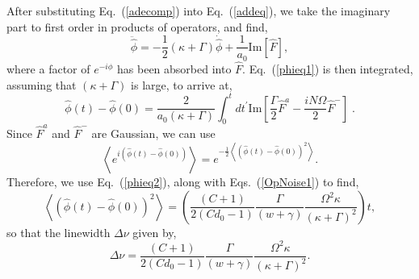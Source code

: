 \documentclass[aps,
twocolumn,
showpacs,
superscriptaddress,groupedaddress]{revtex4}
\begin{document}
After substituting Eq.~(\ref{adecomp}) into Eq.~(\ref{addeq}), we take
the imaginary part to first order in products of operators, and find,
\begin{equation}
\ddot{\hat{\phi}} =
-\frac{1}{2}(\kappa+\Gamma) \dot{\hat{\phi}} +
\frac{1}{a_0} \text{Im} [\hat{F}],
\label{phieq1}
\end{equation}
where a factor of $e^{-i\phi}$ has been absorbed into $\hat{F}$.
Eq.~(\ref{phieq1}) is then integrated, assuming that $(\kappa+\Gamma)$
is large, to arrive at,
\begin{equation}
\hat{\phi}(t) - \hat{\phi}(0) =
\frac{2}{a_0 (\kappa+\Gamma)}
\int_0^t dt^{\prime} \text{Im}
\left[ \frac{\Gamma}{2} \hat{F}^a-\frac{i N \Omega}{2} \hat{F}^-\right]\;.
\label{phieq2}
\end{equation}
Since $ \hat{F}^a$ and $\hat{F}^-$ are Gaussian, we can use
\begin{equation}
\left< e^{i(\hat{\phi}(t) - \hat{\phi}(0))} \right> =
e^{-\frac{1}{2}\left< ( \hat{\phi}(t) - \hat{\phi}(0) )^2 \right>}.
\end{equation}
Therefore, we use Eq.~(\ref{phieq2}), along with Eqs.~(\ref{OpNoise1})
to find,
\begin{equation}
\left<(\hat{\phi}(t) - \hat{\phi}(0))^2 \right> =
\left(\frac{(C+1)}{2(Cd_0-1)} \frac{\Gamma}{(w+\gamma)}
\frac{\Omega^2 \kappa}{(\kappa+\Gamma)^2}\right) t,
\end{equation}
so that the linewidth $\Delta \nu$ given by,
\begin{equation}
\Delta \nu =
\frac{(C+1)}{2(Cd_0-1)} \frac{\Gamma}{(w+\gamma)}
\frac{\Omega^2 \kappa}{(\kappa+\Gamma)^2}.
\label{LWHaken}
\end{equation}


\end{document}
